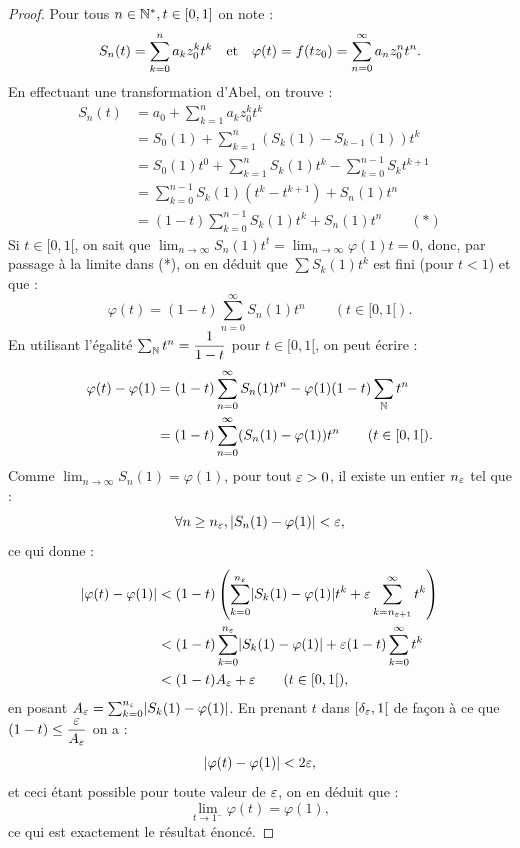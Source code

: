 \begin{proof}
Pour tous $n \in \Ne, t \in [0,1]$ on note :
\[ S_n(t) = \sum_{k=0}^n a_k z_0^k t^k \et \varphi(t) = f(tz_0) = \sum_{n=0}^{\infty} a_n z_0^n t^n  . \]
En effectuant une transformation d'Abel, on trouve :
\begin{align*}
S_n(t) & = a_0 + \sum_{k=1}^n a_k z_0^k t^k \\
& = S_0(1) + \sum_{k=1}^n (S_k(1)-S_{k-1}(1)) t^k \\
& = S_0(1) t^0 + \sum_{k=1}^n S_k(1) t^k - \sum_{k=0}^{n-1} S_k t^{k+1} \\
& = \sum_{k=0}^{n-1} S_k(1)(t^k-t^{k+1}) + S_n(1)t^n \\
& = (1-t) \sum_{k=0}^{n-1} S_k(1) t^k + S_n(1)t^n \qquad (*)
\end{align*}
Si $t \in [0,1[$, on sait que $\lim_{n \to \infty} S_n(1)t^t = \lim_{n \to \infty} \varphi(1) t = 0$, 
donc, par passage à la limite dans (*), on en déduit que $\sum S_k(1) t^k$ est fini (pour $t <1$) et que :
\[ \varphi(t) = (1-t) \sum_{n=0}^{\infty} S_n(1) t^n \qquad (t \in [0,1[) . \]
En utilisant l'égalité $\sum_{\N} t^n = \dfrac1{1-t}$ pour $t \in [0,1[$, on peut écrire :
\begin{align*}
\varphi(t) - \varphi(1) & = (1-t) \sum_{n=0}^{\infty} S_n(1) t^n - \varphi(1) (1-t) \sum_{\N} t^n \\
& = (1-t) \sum_{n=0}^{\infty} (S_n(1) - \varphi(1)) t^n \qquad (t \in [0,1[) . 
\end{align*}
Comme $\lim_{n \to \infty} S_n(1) = \varphi(1)$, pour tout $\veps >0$, il existe un entier $n_{\veps}$ tel que :
\[ \forall n \geq n_{\veps}, \abs*{S_n(1) - \varphi(1)} < \veps , \]
ce qui donne :
\begin{align*}
\abs{\varphi(t) - \varphi(1)} & < (1-t) \left ( \sum_{k=0}^{n_{\veps}} \abs*{S_k(1) - \varphi(1)} t^k + 
\veps \sum_{k=n_{\veps +1}}^{\infty} t^k \right ) \\
& < (1-t) \sum_{k=0}^{n_{\veps}} \abs*{S_k(1) - \varphi(1)} + \veps (1-t) \sum_{k=0}^{\infty} t^k \\
& < (1-t) A_{\veps} + \veps  \qquad (t \in [0,1[),
\end{align*}
en posant $A_{\veps} = \sum_{k=0}^{n_{\veps}} \abs*{S_k(1) - \varphi(1)}$. 
En prenant $t$ dans $[\delta_{\veps},1[$ de façon à ce que $(1-t) \leq \dfrac{\veps}{A_{\veps}}$ on a :
\[ \abs{\varphi(t) - \varphi(1)} < 2\veps , \]
et ceci étant possible pour toute valeur de $\veps$, on en déduit que :
\[ \lim_{t \to 1^{-}} \varphi(t) = \varphi(1) , \]
ce qui est exactement le résultat énoncé.
\end{proof}

